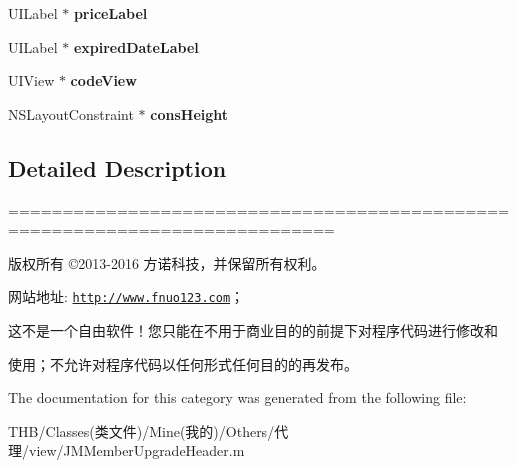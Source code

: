 \begin{DoxyCompactItemize}
\mbox{\label{category_j_m_member_upgrade_header_07_08_a50ab73c66771df7fdc8d44343acacb82}} 
U\+I\+Label $\ast$ {\bfseries price\+Label}
\item 
\mbox{\label{category_j_m_member_upgrade_header_07_08_a80be93ed92f6d661c2f43fd787cf8721}} 
U\+I\+Label $\ast$ {\bfseries expired\+Date\+Label}
\item 
\mbox{\label{category_j_m_member_upgrade_header_07_08_a47c1af2eceb879de56f5578ceb59c65e}} 
U\+I\+View $\ast$ {\bfseries code\+View}
\item 
\mbox{\label{category_j_m_member_upgrade_header_07_08_a262b8c5a475c0094ffe1e75383cd7ca5}} 
N\+S\+Layout\+Constraint $\ast$ {\bfseries cons\+Height}
\end{DoxyCompactItemize}


\subsection{Detailed Description}
============================================================================

版权所有 ©2013-\/2016 方诺科技，并保留所有权利。

网站地址\+: \href{http://www.fnuo123.com}{\tt http\+://www.\+fnuo123.\+com}； 



这不是一个自由软件！您只能在不用于商业目的的前提下对程序代码进行修改和

使用；不允许对程序代码以任何形式任何目的的再发布。 

 

The documentation for this category was generated from the following file\+:\begin{DoxyCompactItemize}
\item 
T\+H\+B/\+Classes(类文件)/\+Mine(我的)/\+Others/代理/view/J\+M\+Member\+Upgrade\+Header.\+m\end{DoxyCompactItemize}

